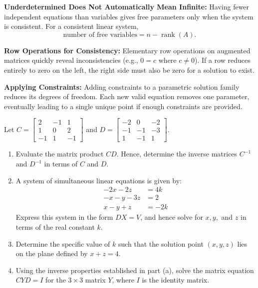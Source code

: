 \begin{takeaways}
\item \textbf{Underdetermined Does Not Automatically Mean Infinite:} Having fewer independent equations than variables gives free parameters only when the system is consistent. For a consistent linear system,
\[
\text{number of free variables}=n-\operatorname{rank}(A).
\]
\item \textbf{Row Operations for Consistency:} Elementary row operations on augmented matrices quickly reveal inconsistencies (e.g., $0 = c$ where $c \neq 0$). If a row reduces entirely to zero on the left, the right side must also be zero for a solution to exist.
\item \textbf{Applying Constraints:} Adding constraints to a parametric solution family reduces its degrees of freedom. Each new valid equation removes one parameter, eventually leading to a single unique point if enough constraints are provided.
\end{takeaways}


\begin{problem}
Let $C = \begin{bmatrix} 2 & -1 & 1 \\ 1 & 0 & 2 \\ -1 & 1 & -1 \end{bmatrix}$ and $D = \begin{bmatrix} -2 & 0 & -2 \\ -1 & -1 & -3 \\ 1 & -1 & 1 \end{bmatrix}$.

\begin{enumerate}[label=\textbf{(\alph*)}]
    \item Evaluate the matrix product $CD$. Hence, determine the inverse matrices $C^{-1}$ and $D^{-1}$ in terms of $C$ and $D$.
    \item A system of simultaneous linear equations is given by:
    \begin{align*}
    -2x - 2z &= 4k \\
    -x - y - 3z &= 2 \\
    x - y + z &= -2k
    \end{align*}
    Express this system in the form $DX = V$, and hence solve for $x, y,$ and $z$ in terms of the real constant $k$.
    \item Determine the specific value of $k$ such that the solution point $(x, y, z)$ lies on the plane defined by $x + z = 4$.
    \item Using the inverse properties established in part (a), solve the matrix equation $C Y D = I$ for the $3 \times 3$ matrix $Y$, where $I$ is the identity matrix.
\end{enumerate}
\end{problem}

